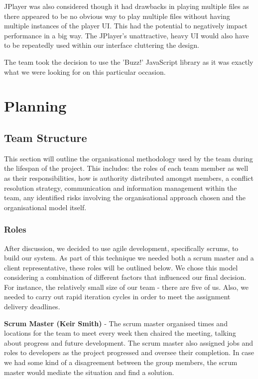 \documentclass{l3proj}
\begin{document}
JPlayer was also considered though it had drawbacks in playing multiple files as there appeared to be no obvious way to play multiple files without having multiple instances of the player UI. This had the potential to negatively impact performance in a big way. The JPlayer's unattractive, heavy UI would also have to be repeatedly used within our interface cluttering the design.

The team took the decision to use the 'Buzz!' JavaScript library as it was exactly what we were looking for on this particular occasion.

\chapter{Planning}
\label{Planning}

\section{Team Structure}This section will outline the organisational methodology used by the team during the lifespan of the project. This includes: the roles of each team member as well as their responsibilities, how is authority distributed amongst members, a conflict resolution strategy, communication and information management within the team, any identified risks involving the organisational approach chosen and the organisational model itself.

\subsection{Roles}After discussion, we decided to use agile development, specifically scrums, to build our system. As part of this technique we needed both a scrum master and a client representative, these roles will be outlined below. We chose this model considering a combination of different factors that influenced our final decision. For instance, the relatively small size of our team - there are five of us. Also, we needed to carry out rapid iteration cycles in order to meet the assignment delivery deadlines.

{\bf Scrum Master (Keir Smith)} - The scrum master organised times and locations for the team to meet every week then chaired the meeting, talking about progress and future development. The scrum master also assigned jobs and roles to developers as the project progressed and oversee their completion. In case we had some kind of a disagreement between the group members, the scrum master would mediate the situation and find a solution.
\end{document}
